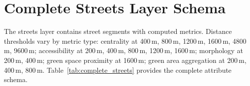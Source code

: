 \section{Complete Streets Layer Schema}
\label{sec:streets-schema}

The streets layer contains street segments with computed metrics. Distance thresholds vary by metric type: centrality at 400\,m, 800\,m, 1200\,m, 1600\,m, 4800\,m, 9600\,m; accessibility at 200\,m, 400\,m, 800\,m, 1200\,m, 1600\,m; morphology at 200\,m, 400\,m; green space proximity at 1600\,m; green area aggregation at 200\,m, 400\,m, 800\,m. Table~\ref{tab:complete_streets} provides the complete attribute schema.

